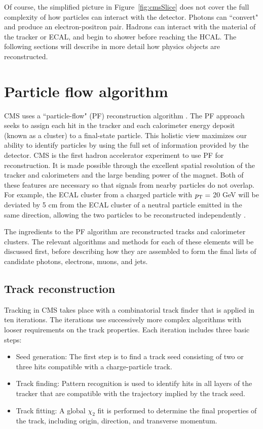 Of course, the simplified picture in Figure~\ref{fig:cmsSlice} does not cover the full complexity of how particles can interact with the detector. Photons can ``convert" and produce an electron-positron pair. Hadrons can interact with the material of the tracker or ECAL, and begin to shower before reaching the HCAL. The following sections will describe in more detail how physics objects are reconstructed. 


\section{Particle flow algorithm}
\label{sec:ParticleFlow}
CMS uses a ``particle-flow" (PF) reconstruction algorithm \cite{ParticleFlow}. The PF approach seeks to assign each hit in the tracker and each calorimeter energy deposit (known as a cluster) to a final-state particle. This holistic view maximizes our ability to identify particles by using the full set of information provided by the detector. CMS is the first hadron accelerator experiment to use PF for reconstruction. It is made possible through the excellent spatial resolution of the tracker and calorimeters and the large bending power of the magnet. Both of these features are necessary so that signals from nearby particles do not overlap. For example, the ECAL cluster from a charged particle with $p_{\mathrm{T}} =$ 20 GeV will be deviated by 5 cm from the ECAL cluster of a neutral particle emitted in the same direction, allowing the two particles to be reconstructed independently \cite{ParticleFlow}.

The ingredients to the PF algorithm are reconstructed tracks and calorimeter clusters. The relevant algorithms and methods for each of these elements will be discussed first, before describing how they are assembled to form the final lists of candidate photons, electrons, muons, and jets. 

\subsection{Track reconstruction}
\label{sec:trackReco}
Tracking in CMS takes place with a combinatorial track finder that is applied in ten iterations. The iterations use successively more complex algorithms with looser requirements on the track properties. Each iteration includes three basic steps:
\begin{itemize}
\item Seed generation: The first step is to find a track seed consisting of two or three hits compatible with a charge-particle track.
\item Track finding: Pattern recognition is used to identify hits in all layers of the tracker that are compatible with the trajectory implied by the track seed. 
\item Track fitting: A global $\chi_2$ fit is performed to determine the final properties of the track, including origin, direction, and transverse momentum. 
\end{itemize}

